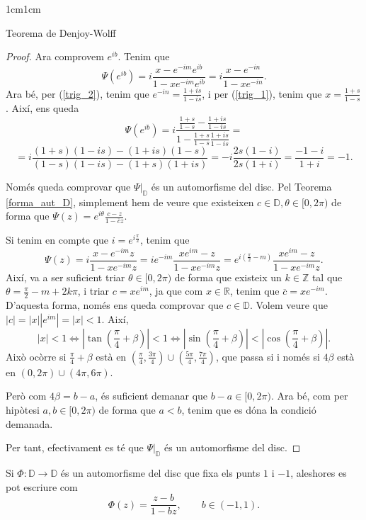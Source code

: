 \begin{adjustwidth}{1cm}{1cm}
\begin{subsection}{Teorema de Denjoy-Wolff}
\begin{proof}
        Ara comprovem $e^{ib}$. Tenim que 
        \[
            \Psi(e^{ib})=i \frac{x-e^{-im}e^{ib}}{1-xe^{-im}e^{ib}}=i \frac{x-e^{-in}}{1-xe^{-in}}.
        \]
        Ara bé, per (\ref{trig_2}), tenim que $e^{-in}=\frac{1+is}{1-is}$, i per (\ref{trig_1}), tenim que $x=\frac{1+s}{1-s}$. Així, ens queda
        \[
            \Psi(e^{ib})=i \frac{\frac{1+s}{1-s}-\frac{1+is}{1-is}}{1-\frac{1+s}{1-s}\frac{1+is}{1-is}}=
        \]
        \[
            =i \frac{(1+s)(1-is)-(1+is)(1-s)}{(1-s)(1-is)-(1+s)(1+is)}=-i\frac{2s(1-i)}{2s(1+i)}=\frac{-1-i}{1+i}=-1.
        \]

        Només queda comprovar que $\Psi|_{\mathbb{D}}$ és un automorfisme del disc. Pel Teorema \ref{forma_aut_D}, simplement hem de veure que existeixen $c\in \mathbb{D}, \theta\in[0,2\pi)$ de forma que $\Psi(z)=e^{i\theta}\frac{c-z}{1-\overline{c}z}$. 

        Si tenim en compte que $i=e^{i \frac{\pi}{2}}$, tenim que
        \[
            \Psi(z)=i\frac{x-e^{-im}z}{1-xe^{-im}z}=ie^{-im}\frac{xe^{im}-z}{1-xe^{-im}z}=e^{i(\frac{\pi}{2}-m)}\frac{xe^{im}-z}{1-xe^{-im}z}.
        \]
        Així, va a ser suficient triar $\theta\in[0,2\pi)$ de forma que existeix un $k\in\mathbb{Z}$ tal que $\theta=\frac{\pi}{2}-m+2k\pi$, i triar $c=xe^{im}$, ja que com $x\in \mathbb{R}$, tenim que $\overline{c}=xe^{-im}$. D'aquesta forma, només ens queda comprovar que $c\in \mathbb{D}$. Volem veure que $|c|=|x||e^{im}|=|x|<1$. Així, 
        \[
            |x|<1 \iff |\tan(\frac{\pi}{4}+\beta)|<1 \iff |\sin(\frac{\pi}{4}+\beta)|<|\cos(\frac{\pi}{4}+\beta)|.
        \]
        Això ocòrre si $\frac{\pi}{4}+\beta$ està en $(\frac{\pi}{4}, \frac{3\pi}{4})\cup(\frac{5\pi}{4}, \frac{7\pi}{4})$, que passa si i només si $4\beta$ està en $(0, 2\pi)\cup(4\pi, 6\pi)$.

        Però com $4\beta=b-a$, és suficient demanar que $b-a\in[0,2\pi)$. Ara bé, com per hipòtesi $a,b\in[0,2\pi)$ de forma que $a<b$, tenim que es dóna la condició demanada.

        Per tant, efectivament es té que $\Psi|_{\mathbb{D}}$ és un automorfisme del disc.

    \end{proof}

    \begin{lema}
        Si $\Phi:\mathbb{D} \to \mathbb{D}$ és un automorfisme del disc que fixa els punts $1$ i $-1$, aleshores es pot escriure com 
        \[
            \Phi(z)=\frac{z-b}{1-bz}, \qquad b\in(-1,1).
        \] 
        \label{lema_dw}
    \end{lema}


\end{subsection}
\end{adjustwidth}
